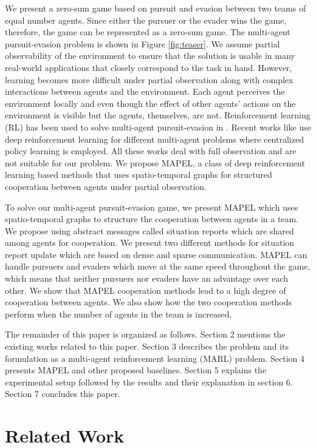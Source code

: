 \documentclass[conference]{IEEEtran}
\begin{document}
We present a zero-sum game based on pursuit and evasion between two teams of equal number agents. Since either the pursuer or the evader wins the game, therefore, the game can be represented as a zero-sum game. The multi-agent pursuit-evasion problem is shown in Figure \ref{fig:teaser}. We assume partial observability of the environment to ensure that the solution is usable in many real-world applications that closely correspond to the task in hand. However, learning becomes more difficult under partial observation along with complex interactions between agents and the environment. Each agent perceives the environment locally and even though the effect of other agents' actions on the environment is visible but the agents, themselves, are not. Reinforcement learning (RL) has been used to solve multi-agent pursuit-evasion in \cite{Parker2002,Yong2009,bilgin2015,kuo2015}. Recent works like \cite{Zhang2018,lowe2017multi,hong2018aamas,Leibo2017} use deep reinforcement learning for different multi-agent problems where centralized policy learning is employed. All these works deal with full observation and are not suitable for our problem. We propose MAPEL, a class of deep reinforcement learning based methods that uses spatio-temporal graphs for structured cooperation between agents under partial observation.

To solve our multi-agent pursuit-evasion game, we present MAPEL which uses spatio-temporal graphs to structure the cooperation between agents in a team. We propose using abstract messages called situation reports which are shared among agents for cooperation. We present two different methods for situation report update which are based on dense and sparse communication. MAPEL can handle pursuers and evaders which move at the same speed throughout the game, which means that neither pursuers nor evaders have an advantage over each other. We show that MAPEL cooperation methods lead to a high degree of cooperation between agents. We also show how the two cooperation methods perform when the number of agents in the team is increased.

The remainder of this paper is organized as follows. Section 2 mentions the existing works related to this paper. Section 3 describes the problem and its formulation as a multi-agent reinforcement learning (MARL) problem. Section 4 presents MAPEL and other proposed baselines. Section 5 explains the experimental setup followed by the results and their explanation in section 6. Section 7 concludes this paper.

\section{Related Work}
\end{document}
